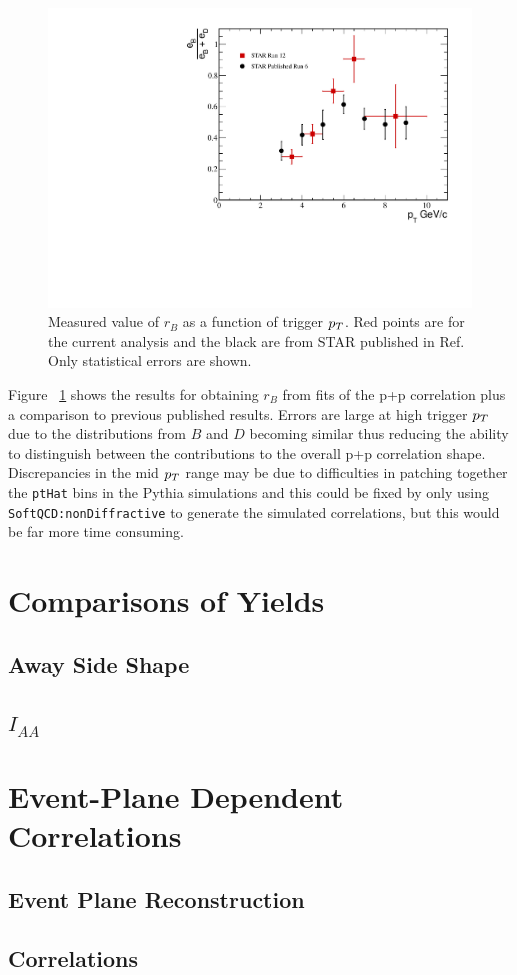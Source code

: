 \begin{figure}[htbp]
\begin{center}
\includegraphics[scale=.8]{Plots/Correlations/BD_ratio.pdf}
\end{center}
\caption[B/D Ratio]{Measured value of $r_B$ as a function of trigger $p_{T}$. Red points are for the current analysis and the black are from STAR published in Ref. Only statistical errors are shown.}
\label{fig:BDRatio}
\end{figure}

Figure ~\ref{fig:BDRatio} shows the results for obtaining $r_B$ from fits of the p+p correlation plus a comparison to previous published results. Errors are large at high trigger $p_{T}$ due to the distributions from $B$ and $D$ becoming similar thus reducing the ability to distinguish between the contributions to the overall p+p correlation shape. Discrepancies in the mid $p_{T}$ range may be due to difficulties in patching together the \texttt{ptHat} bins in the Pythia simulations and this could be fixed by only using \texttt{SoftQCD:nonDiffractive} to generate the simulated correlations, but this would be far more time consuming. 

\section{Comparisons of Yields}

\subsection{Away Side Shape}

\subsection{$I_{AA}$}

\section{Event-Plane Dependent Correlations}

\subsection{Event Plane Reconstruction}

\subsection{Correlations}

